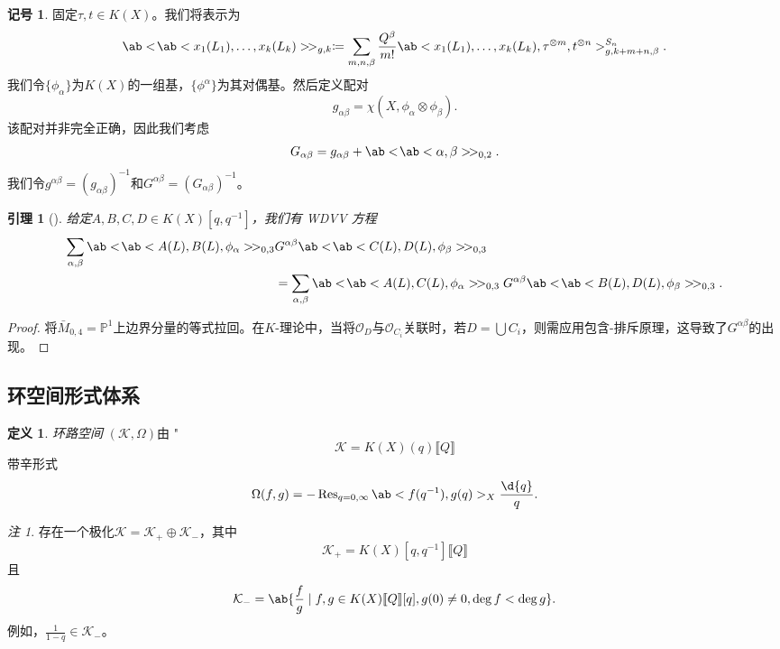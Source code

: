 \documentclass{amsart}
\newtheorem{lem}[thm]{引理}
\theoremstyle{definition}
\newtheorem{defn}[thm]{定义}
\newtheorem{notn}[thm]{记号}
\theoremstyle{remark}
\newtheorem{rmk}[thm]{注}
\theoremstyle{plain}
\theoremstyle{definition}
\theoremstyle{remark}
\renewcommand{\P}{\mathbb{P}}
\newcommand{\mc}[1]{\mathcal{#1}}
\newcommand{\on}[1]{\operatorname{#1}}
\newcommand{\1}{\mathbf{1}}
\newcommand{\2}{\mathbf{2}}
\newcommand{\3}{\mathbf{3}}
\newcommand{\ps}[1]{\llbracket #1 \rrbracket}
\begin{document}
\begin{notn}
固定\(\tau, t \in K(X)\)。我们将表示为
    \[ \ab<\!\ab<x_1(L_1), \ldots, x_k(L_k)>\!>_{g,k} \coloneqq \sum_{m,n,\beta} \frac{Q^{\beta}}{m!} \ab<x_1(L_1), \ldots, x_k(L_k), \tau^{\otimes m}, t^{\otimes n}>_{g,k+m+n,\beta}^{S_n}. \]
我们令\(\{\phi_{\alpha}\}\)为\(K(X)\)的一组基，\(\{\phi^{\alpha}\}\)为其对偶基。然后定义配对
    \[ g_{\alpha\beta} = \chi(X, \phi_{\alpha} \otimes \phi_{\beta}). \]
该配对并非完全正确，因此我们考虑
    \[ G_{\alpha\beta} = g_{\alpha\beta} + \ab<\!\ab<\alpha,\beta>\!>_{0,2}. \]
我们令\(g^{\alpha\beta} = (g_{\alpha\beta})^{-1}\)和\(G^{\alpha\beta} = (G_{\alpha\beta})^{-1}\)。
\end{notn}

\begin{lem}[{\cite{Givental2000K}}]
给定\(A,B,C,D \in K(X)[q,q^{-1}]\)，我们有 \textit{WDVV 方程}
    \begin{align*}
        \sum_{\alpha,\beta} \ab<\!\ab< A(L), B(L), \phi_{\alpha}>\! >_{0,3}& G^{\alpha\beta}\ab<\!\ab< C(L), D(L), \phi_{\beta}>\! >_{0,3} \\
        &= \sum_{\alpha,\beta} \ab<\!\ab< A(L), C(L), \phi_{\alpha}>\! >_{0,3} G^{\alpha\beta}\ab<\!\ab< B(L), D(L), \phi_{\beta}>\! >_{0,3}. 
    \end{align*}
\end{lem}

\begin{proof}
将\(\bar{M}_{0,4} = \P^1\)上边界分量的等式拉回。在\(K\)-理论中，当将\(\mc{O}_D\)与\(\mc{O}_{C_i}\)关联时，若\(D = \bigcup C_i\)，则需应用包含-排斥原理，这导致了\(G^{\alpha\beta}\)的出现。
\end{proof}

\subsection{环空间形式体系}%
\label{sub:Loop space formalism}

\begin{defn}
\textit{ 环路空间 } \((\mc{K}, \Omega)\)由 "
    \[ \mc{K} = K(X)(q) \ps{Q}\]
带辛形式
    \[ \Omega(f, g) = - \on{Res}_{q = 0, \infty} \ab<f(q^{-1}), g(q)>_X \frac{\d{q}}{q}. \]
\end{defn}

\begin{rmk}
存在一个极化\(\mc{K} = \mc{K}_+ \oplus \mc{K}_-\)，其中
    \[ \mc{K}_+ = K(X)[q, q^{-1}]\ps{Q} \]
    且
    \[ \mc{K}_- = \ab\{ \frac{f}{g} \mid f, g \in K(X)\ps{Q}[q], g(0) \neq 0, \deg f < \deg g\}. \]
例如，\(\frac{1}{1-q} \in \mc{K}_-\)。
\end{rmk}
\end{document}
